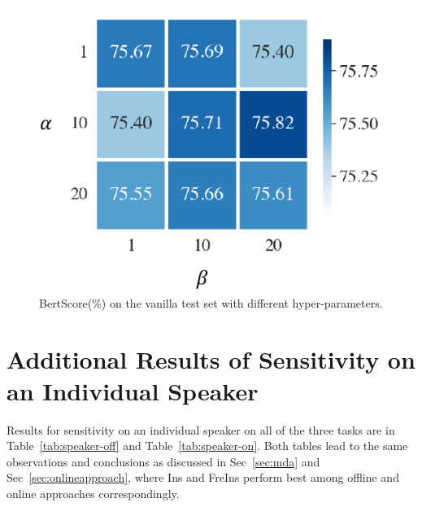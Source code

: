 \begin{figure}[t]
	\centering
	\includegraphics[scale=0.6]{hyper-parameters.pdf}
	\caption{BertScore(\%) on the vanilla test set with different hyper-parameters.} %
	\label{fig:hyper}
\end{figure}



\section{Additional Results of Sensitivity on an Individual Speaker}
\label{sec:app-results}
Results for sensitivity on an individual speaker on all of the three tasks are in Table~\ref{tab:speaker-off} and Table~\ref{tab:speaker-on}. Both tables lead to the same observations and conclusions as discussed in Sec~\ref{sec:mda} and Sec~\ref{sec:onlineapproach}, where Ins and FreIns perform best among offline and online approaches correspondingly. 

